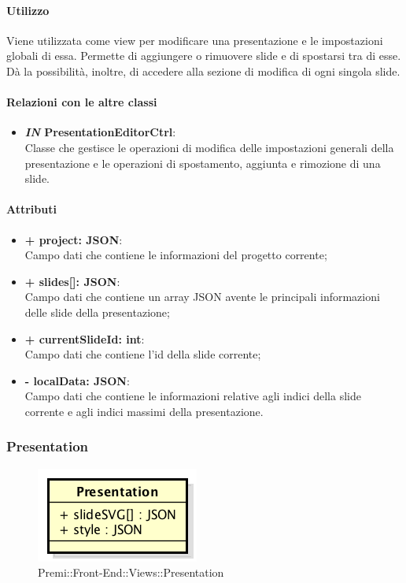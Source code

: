 	\paragraph{Utilizzo}
	Viene utilizzata come view per modificare una presentazione e le impostazioni globali di essa. Permette di aggiungere o rimuovere slide e di spostarsi tra di esse. Dà la possibilità, inoltre, di accedere alla sezione di modifica di ogni singola slide.
	
	\paragraph{Relazioni con le altre classi}
	\begin{itemize}
		\item \textbf{\textit{IN} PresentationEditorCtrl}:\\
		Classe che gestisce le operazioni di modifica delle impostazioni generali della presentazione e le operazioni di spostamento, aggiunta e rimozione di una slide.
	\end{itemize}
	
	\paragraph{Attributi}
	\begin{itemize}
		\item \textbf{+ project: JSON}:\\
		Campo dati che contiene le informazioni del progetto corrente;
		\item \textbf{+ slides[]: JSON}:\\
		Campo dati che contiene un array JSON avente le principali informazioni delle slide della presentazione;
		\item \textbf{+ currentSlideId: int}:\\
		Campo dati che contiene l'id della slide corrente;
		\item \textbf{- localData: JSON}:\\
		Campo dati che contiene le informazioni relative agli indici della slide corrente e agli indici massimi della presentazione.
	\end{itemize}
	
	
\subsubsection{Presentation}
	\begin{figure}[h]
		\centering
		\includegraphics[width=0.3\linewidth]{img/premi_front_end_views_presentation}
		\caption[Premi::Front-End::Views::Presentation]{Premi::Front-End::Views::Presentation}
	\end{figure}
	
